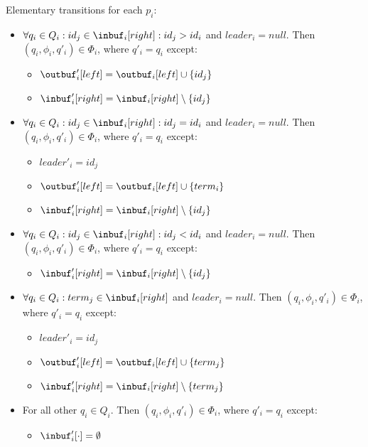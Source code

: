 Elementary transitions for each $p_i$:
\begin{itemize}
\item $\forall q_i \in Q_i: id_j \in \inbuf_i[right]: id_j > id_i$ and $leader_i = null$.
      Then $(q_i, \phi_i, q'_i) \in \Phi_i$,
      where $q'_i = q_i$ except:
      \begin{itemize}
      \item $\outbuf'_i[left] = \outbuf_i[left] \cup \{id_j\}$
      \item $\inbuf'_i[right] = \inbuf_i[right] \setminus \{id_j\}$
      \end{itemize}
\item $\forall q_i \in Q_i: id_j \in \inbuf_i[right]: id_j = id_i$ and $leader_i = null$.
      Then $(q_i, \phi_i, q'_i) \in \Phi_i$,
      where $q'_i = q_i$ except:
      \begin{itemize}
      \item $leader'_i = id_j$
      \item $\outbuf'_i[left] = \outbuf_i[left] \cup \{term_i\}$
      \item $\inbuf'_i[right] = \inbuf_i[right] \setminus \{id_j\}$
      \end{itemize}
\item $\forall q_i \in Q_i: id_j \in \inbuf_i[right]: id_j < id_i$ and $leader_i = null$.
      Then $(q_i, \phi_i, q'_i) \in \Phi_i$,
      where $q'_i = q_i$ except:
      \begin{itemize}
      \item $\inbuf'_i[right] = \inbuf_i[right] \setminus \{id_j\}$
      \end{itemize}
\item $\forall q_i \in Q_i: term_j \in \inbuf_i[right]$ and $leader_i = null$.
      Then $(q_i, \phi_i, q'_i) \in \Phi_i$,
      where $q'_i = q_i$ except:
      \begin{itemize}
      \item $leader'_i = id_j$
      \item $\outbuf'_i[left] = \outbuf_i[left] \cup \{term_j\}$
      \item $\inbuf'_i[right] = \inbuf_i[right] \setminus \{term_j\}$
      \end{itemize}
\item For all other $q_i \in Q_i$.
      Then $(q_i, \phi_i, q'_i) \in \Phi_i$,
      where $q'_i = q_i$ except:
      \begin{itemize}
      \item $\inbuf'_i[\cdot] = \emptyset$
      \end{itemize}
\end{itemize}


